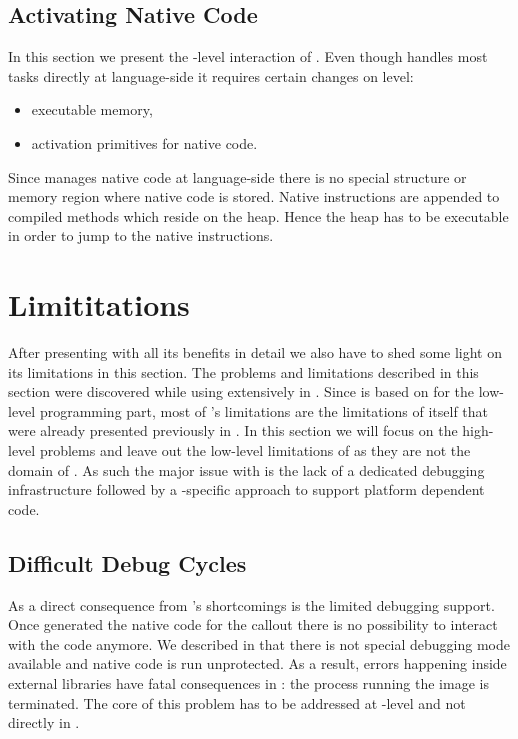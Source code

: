 \subsection{Activating Native Code}

In this section we present the \VM-level interaction of \NB.
Even though \NB handles most tasks directly at language-side it requires certain changes on \VM level:
%
\begin{itemize}[noitemsep]
	\item executable memory,
	\item activation primitives for native code.
\end{itemize}
%
Since \NB manages native code at language-side there is no special structure or memory region where native code is stored.
Native instructions are appended to compiled methods which reside on the heap.
Hence the heap has to be executable in order to jump to the native instructions.


\section{\NB Limititations}

After presenting \NB with all its benefits in detail we also have to shed some light on its limitations in this section. 
The problems and limitations described in this section were discovered while using \NB extensively in \PH.
Since \NB is based on \B for the low-level programming part, most of \NB's limitations are the limitations of \B itself that were already presented previously in .
In this section we will focus on the high-level problems and leave out the low-level limitations of \B as they are not the domain of \NB.
As such the major issue with \NB is the lack of a dedicated debugging infrastructure followed by a \NB-specific approach to support platform dependent code.

\subsection{Difficult Debug Cycles}
As a direct consequence from \B's shortcomings is the limited debugging support.
Once \NB generated the native code for the callout there is no possibility to interact with the code anymore.
We \B described in  that there is not special debugging mode available and native code is run unprotected.
As a result, errors happening inside external libraries have fatal consequences in \NB: the process running the \PH image is terminated.
The core of this problem has to be addressed at \B-level and not directly in \NB.


